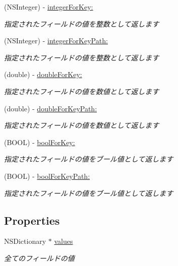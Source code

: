 \begin{DoxyCompactItemize}
(N\-S\-Integer) -\/ \hyperlink{interface_b_d_basic_object_a4a5603ec090a65e3ab5d789606aa125b}{integer\-For\-Key\-:}
\begin{DoxyCompactList}\small\item\em 指定されたフィールドの値を整数として返します \end{DoxyCompactList}\item 
(N\-S\-Integer) -\/ \hyperlink{interface_b_d_basic_object_a9a9544e9db54317e6077d50f8a0fcf2f}{integer\-For\-Key\-Path\-:}
\begin{DoxyCompactList}\small\item\em 指定されたフィールドの値を整数として返します \end{DoxyCompactList}\item 
(double) -\/ \hyperlink{interface_b_d_basic_object_a704e9afbb1062bbf785502f346359599}{double\-For\-Key\-:}
\begin{DoxyCompactList}\small\item\em 指定されたフィールドの値を数値として返します \end{DoxyCompactList}\item 
(double) -\/ \hyperlink{interface_b_d_basic_object_a1c2338aeffa4a66eacaecee26f845691}{double\-For\-Key\-Path\-:}
\begin{DoxyCompactList}\small\item\em 指定されたフィールドの値を数値として返します \end{DoxyCompactList}\item 
(B\-O\-O\-L) -\/ \hyperlink{interface_b_d_basic_object_afb422bdc98a34a85786742b2dcc1efa9}{bool\-For\-Key\-:}
\begin{DoxyCompactList}\small\item\em 指定されたフィールドの値をブール値として返します \end{DoxyCompactList}\item 
(B\-O\-O\-L) -\/ \hyperlink{interface_b_d_basic_object_a044acd912c20ddbd89caa9c6217abd5b}{bool\-For\-Key\-Path\-:}
\begin{DoxyCompactList}\small\item\em 指定されたフィールドの値をブール値として返します \end{DoxyCompactList}\end{DoxyCompactItemize}
\subsection*{Properties}
\begin{DoxyCompactItemize}
\item 
\hypertarget{interface_b_d_basic_object_a6ce8d2a376e300813d1db55767857d0d}{N\-S\-Dictionary $\ast$ \hyperlink{interface_b_d_basic_object_a6ce8d2a376e300813d1db55767857d0d}{values}}\label{interface_b_d_basic_object_a6ce8d2a376e300813d1db55767857d0d}

\begin{DoxyCompactList}\small\item\em 全てのフィールドの値 \end{DoxyCompactList}\end{DoxyCompactItemize}


